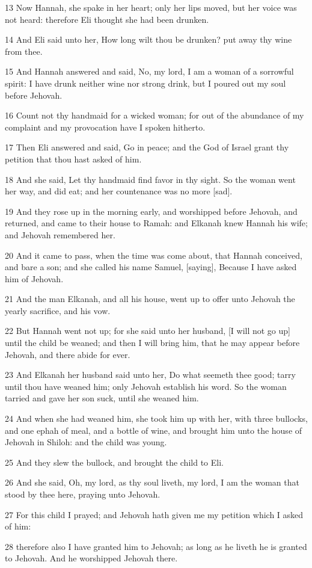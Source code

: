 \par 13 Now Hannah, she spake in her heart; only her lips moved, but her voice was not heard: therefore Eli thought she had been drunken.
\par 14 And Eli said unto her, How long wilt thou be drunken? put away thy wine from thee.
\par 15 And Hannah answered and said, No, my lord, I am a woman of a sorrowful spirit: I have drunk neither wine nor strong drink, but I poured out my soul before Jehovah.
\par 16 Count not thy handmaid for a wicked woman; for out of the abundance of my complaint and my provocation have I spoken hitherto.
\par 17 Then Eli answered and said, Go in peace; and the God of Israel grant thy petition that thou hast asked of him.
\par 18 And she said, Let thy handmaid find favor in thy sight. So the woman went her way, and did eat; and her countenance was no more [sad].
\par 19 And they rose up in the morning early, and worshipped before Jehovah, and returned, and came to their house to Ramah: and Elkanah knew Hannah his wife; and Jehovah remembered her.
\par 20 And it came to pass, when the time was come about, that Hannah conceived, and bare a son; and she called his name Samuel, [saying], Because I have asked him of Jehovah.
\par 21 And the man Elkanah, and all his house, went up to offer unto Jehovah the yearly sacrifice, and his vow.
\par 22 But Hannah went not up; for she said unto her husband, [I will not go up] until the child be weaned; and then I will bring him, that he may appear before Jehovah, and there abide for ever.
\par 23 And Elkanah her husband said unto her, Do what seemeth thee good; tarry until thou have weaned him; only Jehovah establish his word. So the woman tarried and gave her son suck, until she weaned him.
\par 24 And when she had weaned him, she took him up with her, with three bullocks, and one ephah of meal, and a bottle of wine, and brought him unto the house of Jehovah in Shiloh: and the child was young.
\par 25 And they slew the bullock, and brought the child to Eli.
\par 26 And she said, Oh, my lord, as thy soul liveth, my lord, I am the woman that stood by thee here, praying unto Jehovah.
\par 27 For this child I prayed; and Jehovah hath given me my petition which I asked of him:
\par 28 therefore also I have granted him to Jehovah; as long as he liveth he is granted to Jehovah. And he worshipped Jehovah there.

